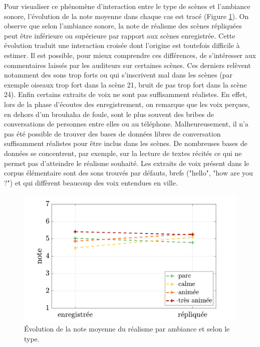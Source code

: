 Pour visualiser ce phénomène d'interaction entre le type de scènes et l'ambiance sonore, l'évolution de la note moyenne dans chaque cas est tracé (Figure \ref{fig:interaction_ambianceType}). On observe que selon l'ambiance sonore, la note de réalisme des scènes répliquées peut être inférieure ou supérieure par rapport aux scènes enregistrée. Cette évolution traduit une interaction croisée dont l'origine est toutefois difficile à estimer. Il est possible, pour mieux comprendre ces différences, de s'intéresser aux commentaires laissés par les auditeurs sur certaines scènes. Ces derniers relèvent notamment des sons trop forts ou qui s'inscrivent mal dans les scènes (par exemple oiseaux trop fort dans la scène 21, bruit de pas trop fort dans la scène 24). Enfin certains extraits de voix ne sont pas suffisamment réalistes. En effet, lors de la phase d'écoutes des enregistrement, on remarque que les voix perçues, en dehors d'un brouhaha de foule, sont le plus souvent des bribes de conversations de personnes entre elles ou au téléphone. Malheureusement, il n'a pas été possible de trouver des bases de données libres de conversation suffisamment réalistes pour être inclus dans les scènes. De nombreuses bases de données se concentrent, par exemple, sur la lecture de textes récités \cite{el2011survey, kominek2004cmu, barker2015third} ce qui ne permet pas d'atteindre le réalisme souhaité. Les extraits de voix présent dans le corpus élémentaire sont des sons trouvés par défauts, brefs ("hello", "how are you ?") et qui diffèrent beaucoup des voix entendues en ville.

\begin{figure}[h]
\centering
\includegraphics[width=0.8\linewidth]{./figures/test_perceptif/testPerceptif_interactionAmbiance.pdf}
\caption{Évolution de la note moyenne du réalisme par ambiance et selon le type.}\label{fig:interaction_ambianceType}
\end{figure}


